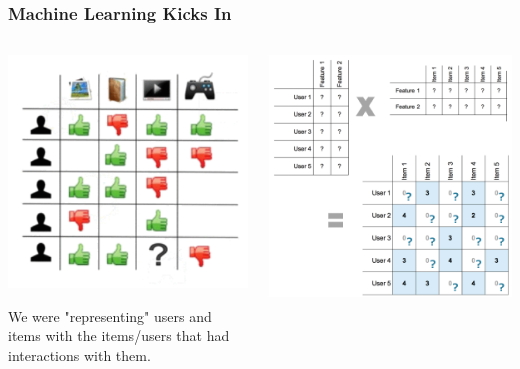 \documentclass[11pt]{beamer}
\begin{document}
	\begin{frame}
		\frametitle{Machine Learning Kicks In}
		\begin{columns}
			\begin{column}{0.5\textwidth}
				\begin{center}
					\centering
					\includegraphics[width=\textwidth]{images/cf-stage2.png}
					
					We were "representing" users and items with the items/users that had interactions with them.
				\end{center}
			\end{column}\pause
			\begin{column}{0.5\textwidth}
				\begin{center}
					\centering
					\includegraphics[width=\textwidth]{images/matrix_factorization.png}
					

\end{center}
\end{column}
\end{columns}
\end{frame}
\end{document}
